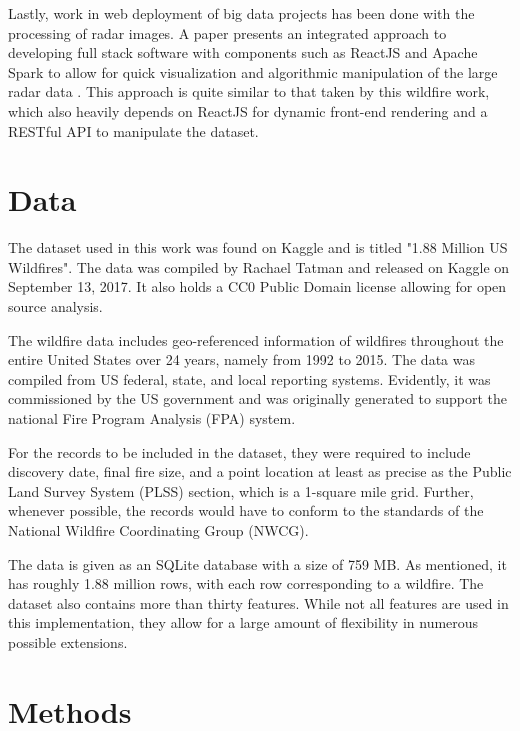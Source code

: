 \documentclass[conference]{IEEEtran}
\begin{document}
Lastly, work in web deployment of big data projects has been done with the processing of radar images. A paper presents an integrated approach to developing full stack software with components such as ReactJS and Apache Spark to allow for quick visualization and algorithmic manipulation of the large radar data \cite{potapovinformation}. This approach is quite similar to that taken by this wildfire work, which also heavily depends on ReactJS for dynamic front-end rendering and a RESTful API to manipulate the dataset. \par

\section{Data}
The dataset used in this work was found on Kaggle and is titled "1.88 Million US Wildfires". The data was compiled by Rachael Tatman and released on Kaggle on September 13, 2017. It also holds a CC0 Public Domain license allowing for open source analysis. \par

The wildfire data includes geo-referenced information of wildfires throughout the entire United States over 24 years, namely from 1992 to 2015. The data was compiled from US federal, state, and local reporting systems. Evidently, it was commissioned by the US government and was originally generated to support the national Fire Program Analysis (FPA) system. \par

For the records to be included in the dataset, they were required to include discovery date, final fire size, and a point location at least as precise as the Public Land Survey System (PLSS) section, which is a 1-square mile grid. Further, whenever possible, the records would have to conform to the standards of the National Wildfire Coordinating Group (NWCG). \par

The data is given as an SQLite database with a size of 759 MB. As mentioned, it has roughly 1.88 million rows, with each row corresponding to a wildfire. The dataset also contains more than thirty features. While not all features are used in this implementation, they allow for a large amount of flexibility in numerous possible extensions. \par

\section{Methods}
\end{document}
